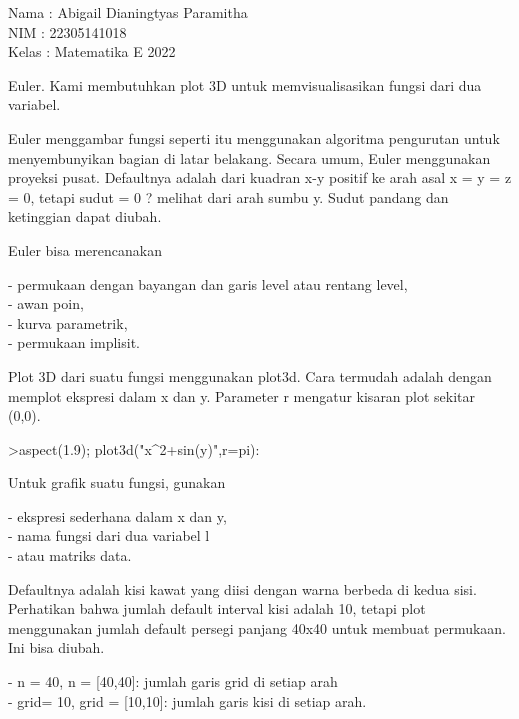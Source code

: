 \documentclass[a4paper,10pt]{article}
\begin{document}
\begin{eulernotebook}
\begin{eulercomment}
Nama : Abigail Dianingtyas Paramitha\\
NIM : 22305141018\\
Kelas : Matematika E 2022\\
\end{eulercomment}
\eulersubheading{}
\begin{eulercomment}
\begin{eulercomment}
\begin{eulercomment}
Euler. Kami membutuhkan plot 3D untuk memvisualisasikan fungsi dari
dua variabel.

Euler menggambar fungsi seperti itu menggunakan algoritma pengurutan
untuk menyembunyikan bagian di latar belakang. Secara umum, Euler
menggunakan proyeksi pusat. Defaultnya adalah dari kuadran x-y positif
ke arah asal x = y = z = 0, tetapi sudut = 0 ? melihat dari arah sumbu
y. Sudut pandang dan ketinggian dapat diubah.

Euler bisa merencanakan

- permukaan dengan bayangan dan garis level atau rentang level,\\
- awan poin,\\
- kurva parametrik,\\
- permukaan implisit.

Plot 3D dari suatu fungsi menggunakan plot3d. Cara termudah adalah
dengan memplot ekspresi dalam x dan y. Parameter r mengatur kisaran
plot sekitar (0,0).
\end{eulercomment}
\begin{eulerprompt}
>aspect(1.9); plot3d("x^2+sin(y)",r=pi):
\end{eulerprompt}
\begin{eulercomment}
Untuk grafik suatu fungsi, gunakan

- ekspresi sederhana dalam x dan y,\\
- nama fungsi dari dua variabel l\\
- atau matriks data.

Defaultnya adalah kisi kawat yang diisi dengan warna berbeda di kedua
sisi. Perhatikan bahwa jumlah default interval kisi adalah 10, tetapi
plot menggunakan jumlah default persegi panjang 40x40 untuk membuat
permukaan. Ini bisa diubah.

- n = 40, n = [40,40]: jumlah garis grid di setiap arah\\
- grid= 10, grid = [10,10]: jumlah garis kisi di setiap arah.


\end{eulercomment}
\end{eulercomment}
\end{eulercomment}
\end{eulernotebook}
\end{document}
